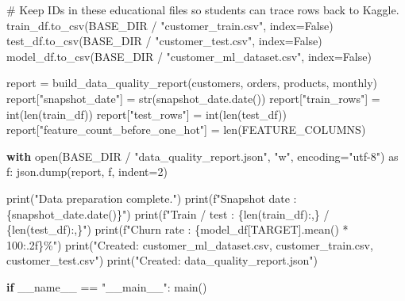\documentclass[
  indonesian,
  letterpaper,
  DIV=11,
  numbers=noendperiod]{scrreprt}
\newenvironment{Shaded}{\begin{snugshade}}{\end{snugshade}}
\newcommand{\BuiltInTok}[1]{\textcolor[rgb]{0.00,0.23,0.31}{#1}}
\newcommand{\CommentTok}[1]{\textcolor[rgb]{0.37,0.37,0.37}{#1}}
\newcommand{\ControlFlowTok}[1]{\textcolor[rgb]{0.00,0.23,0.31}{\textbf{#1}}}
\newcommand{\DecValTok}[1]{\textcolor[rgb]{0.68,0.00,0.00}{#1}}
\newcommand{\ImportTok}[1]{\textcolor[rgb]{0.00,0.46,0.62}{#1}}
\newcommand{\NormalTok}[1]{\textcolor[rgb]{0.00,0.23,0.31}{#1}}
\newcommand{\OperatorTok}[1]{\textcolor[rgb]{0.37,0.37,0.37}{#1}}
\newcommand{\SpecialCharTok}[1]{\textcolor[rgb]{0.37,0.37,0.37}{#1}}
\newcommand{\SpecialStringTok}[1]{\textcolor[rgb]{0.13,0.47,0.30}{#1}}
\newcommand{\StringTok}[1]{\textcolor[rgb]{0.13,0.47,0.30}{#1}}
\newcommand{\VariableTok}[1]{\textcolor[rgb]{0.07,0.07,0.07}{#1}}
\begin{document}
\begin{Shaded}
\begin{Highlighting}[]
    \CommentTok{\# Keep IDs in these educational files so students can trace rows back to Kaggle.}
\NormalTok{    train\_df.to\_csv(BASE\_DIR }\OperatorTok{/} \StringTok{"customer\_train.csv"}\NormalTok{, index}\OperatorTok{=}\VariableTok{False}\NormalTok{)}
\NormalTok{    test\_df.to\_csv(BASE\_DIR }\OperatorTok{/} \StringTok{"customer\_test.csv"}\NormalTok{, index}\OperatorTok{=}\VariableTok{False}\NormalTok{)}
\NormalTok{    model\_df.to\_csv(BASE\_DIR }\OperatorTok{/} \StringTok{"customer\_ml\_dataset.csv"}\NormalTok{, index}\OperatorTok{=}\VariableTok{False}\NormalTok{)}

\NormalTok{    report }\OperatorTok{=}\NormalTok{ build\_data\_quality\_report(customers, orders, products, monthly)}
\NormalTok{    report[}\StringTok{"snapshot\_date"}\NormalTok{] }\OperatorTok{=} \BuiltInTok{str}\NormalTok{(snapshot\_date.date())}
\NormalTok{    report[}\StringTok{"train\_rows"}\NormalTok{] }\OperatorTok{=} \BuiltInTok{int}\NormalTok{(}\BuiltInTok{len}\NormalTok{(train\_df))}
\NormalTok{    report[}\StringTok{"test\_rows"}\NormalTok{] }\OperatorTok{=} \BuiltInTok{int}\NormalTok{(}\BuiltInTok{len}\NormalTok{(test\_df))}
\NormalTok{    report[}\StringTok{"feature\_count\_before\_one\_hot"}\NormalTok{] }\OperatorTok{=} \BuiltInTok{len}\NormalTok{(FEATURE\_COLUMNS)}

    \ControlFlowTok{with} \BuiltInTok{open}\NormalTok{(BASE\_DIR }\OperatorTok{/} \StringTok{"data\_quality\_report.json"}\NormalTok{, }\StringTok{"w"}\NormalTok{, encoding}\OperatorTok{=}\StringTok{"utf{-}8"}\NormalTok{) }\ImportTok{as}\NormalTok{ f:}
\NormalTok{        json.dump(report, f, indent}\OperatorTok{=}\DecValTok{2}\NormalTok{)}

    \BuiltInTok{print}\NormalTok{(}\StringTok{"Data preparation complete."}\NormalTok{)}
    \BuiltInTok{print}\NormalTok{(}\SpecialStringTok{f"Snapshot date : }\SpecialCharTok{\{}\NormalTok{snapshot\_date}\SpecialCharTok{.}\NormalTok{date()}\SpecialCharTok{\}}\SpecialStringTok{"}\NormalTok{)}
    \BuiltInTok{print}\NormalTok{(}\SpecialStringTok{f"Train / test : }\SpecialCharTok{\{}\BuiltInTok{len}\NormalTok{(train\_df)}\SpecialCharTok{:,\}}\SpecialStringTok{ / }\SpecialCharTok{\{}\BuiltInTok{len}\NormalTok{(test\_df)}\SpecialCharTok{:,\}}\SpecialStringTok{"}\NormalTok{)}
    \BuiltInTok{print}\NormalTok{(}\SpecialStringTok{f"Churn rate   : }\SpecialCharTok{\{}\NormalTok{model\_df[TARGET]}\SpecialCharTok{.}\NormalTok{mean() }\OperatorTok{*} \DecValTok{100}\SpecialCharTok{:.2f\}}\SpecialStringTok{\%"}\NormalTok{)}
    \BuiltInTok{print}\NormalTok{(}\StringTok{"Created: customer\_ml\_dataset.csv, customer\_train.csv, customer\_test.csv"}\NormalTok{)}
    \BuiltInTok{print}\NormalTok{(}\StringTok{"Created: data\_quality\_report.json"}\NormalTok{)}


\ControlFlowTok{if} \VariableTok{\_\_name\_\_} \OperatorTok{==} \StringTok{"\_\_main\_\_"}\NormalTok{:}
\NormalTok{    main()}
\end{Highlighting}
\end{Shaded}
\end{document}
